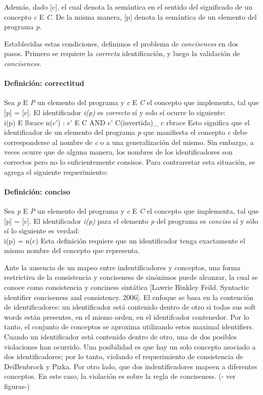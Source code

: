Además, dado [c], el cual denota la semántica en el sentido del significado de un concepto \textit{c} E \textit{C}. De la misma manera, [p] denota la semántica de un elemento del programa \textit{p}.

Establecidas estas condiciones, definimos el problema de \textit{conciseness} en dos pasos. Primero se requiere la \textit{correcta} identificación, y luego la validación de \textit{conciseness}.

\paragraph{Definición: correctitud}
Sea \textit{p} E \textit{P} un elemento del programa y \textit{c} E \textit{C} el concepto que implementa, tal que [p] = [c]. El identificador \textit{i(p)} es \textit{correcto} sí y solo sí ocurre lo siguiente:
\\i(p) E lbrace n(c') : c' E C AND c' C(invertida)\_ c rbrace
Esto significa que el identificador de un elemento del programa \textit{p} que manifiesta el concepto \textit{c} debe corresponderse al nombre de \textit{c} o a una generalización del mismo. Sin embargo, a veces ocurre que de alguna manera, los nombres de los identificadores son correctos pero no lo suficientemente consisos. Para contrarestar esta situación, se agrega el siguiente requerimiento:

\paragraph{Definición: conciso}
Sea \textit{p} E \textit{P} un elemento del programa y \textit{c} E \textit{C} el concepto que implementa, tal que [p] = [c]. El identificador \textit{i(p)} para el elemento \textit{p} del programa es \textit{conciso} sí y sólo sí lo siguiente es verdad:
\\i(p) = n(c)
Esta definición requiere que un identificador tenga exactamente el mismo nombre del concepto que representa.

Ante la ausencia de un mapeo entre indentificadores y conceptos, una forma restrictiva de la consistencia y conciseness de sinónimos puede alcanzar, la cual se conoce como consistencia y conciness sintática [Lawrie Binkley Feild. Syntactic identifier conciseness and consistency. 2006]. 
El enfoque se basa en la contención de identificadores: un identificador está contenido dentro de otro si todas sus soft words están presentes, en el mismo orden, en el identifcador contenedor. 
Por lo tanto, el conjunto de conceptos se aproxima utilizando estos maximal identifiers.
Cuando un identificador está contenido dentro de otro, una de dos posibles violaciones han ocurrido. Una posibilidad es que hay un solo concepto asociado a dos identificadores; por lo tanto, violando el requerimiento de consistencia de DeiBenbrock y Pizka. Por otro lado, que dos indentificadores mapeen a diferentes conceptos. En este caso, la violación es sobre la regla de conciseness. (- ver figuras-)

